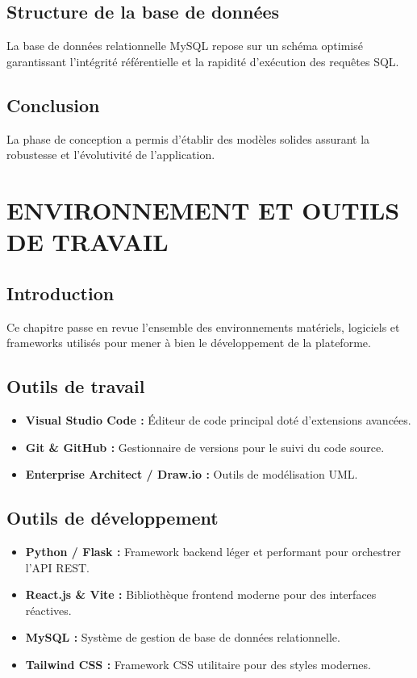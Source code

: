 \documentclass[12pt, a4paper, oneside]{report}
\begin{document}
\section{Structure de la base de données}
La base de données relationnelle MySQL repose sur un schéma optimisé garantissant l'intégrité référentielle et la rapidité d'exécution des requêtes SQL.

\section{Conclusion}
La phase de conception a permis d’établir des modèles solides assurant la robustesse et l'évolutivité de l'application.

\chapter{ENVIRONNEMENT ET OUTILS DE TRAVAIL}

\section{Introduction}
Ce chapitre passe en revue l'ensemble des environnements matériels, logiciels et frameworks utilisés pour mener à bien le développement de la plateforme.

\section{Outils de travail}
\begin{itemize}
  \item \textbf{Visual Studio Code :} Éditeur de code principal doté d'extensions avancées.
  \item \textbf{Git \& GitHub :} Gestionnaire de versions pour le suivi du code source.
  \item \textbf{Enterprise Architect / Draw.io :} Outils de modélisation UML.
\end{itemize}

\section{Outils de développement}
\begin{itemize}
  \item \textbf{Python / Flask :} Framework backend léger et performant pour orchestrer l'API REST.
  \item \textbf{React.js \& Vite :} Bibliothèque frontend moderne pour des interfaces réactives.
  \item \textbf{MySQL :} Système de gestion de base de données relationnelle.
  \item \textbf{Tailwind CSS :} Framework CSS utilitaire pour des styles modernes.
\end{itemize}
\end{document}

